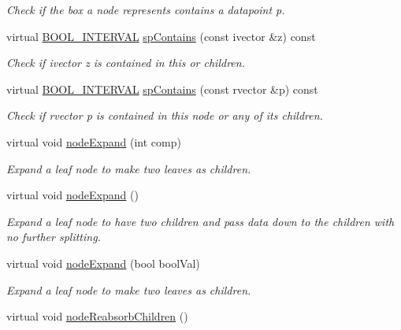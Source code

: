 \begin{DoxyCompactItemize}
\begin{DoxyCompactList}\small\item\em \-Check if the box a node represents contains a datapoint p. \end{DoxyCompactList}\item 
virtual \hyperlink{namespacesubpavings_abf44b15764c504d6ffa87c62b45b01a6}{\-B\-O\-O\-L\-\_\-\-I\-N\-T\-E\-R\-V\-A\-L} \hyperlink{classsubpavings_1_1SPnode_aa90c047beb6a8b6a4beb74342ad593a3}{sp\-Contains} (const ivector \&z) const 
\begin{DoxyCompactList}\small\item\em \-Check if ivector z is contained in this or children. \end{DoxyCompactList}\item 
virtual \hyperlink{namespacesubpavings_abf44b15764c504d6ffa87c62b45b01a6}{\-B\-O\-O\-L\-\_\-\-I\-N\-T\-E\-R\-V\-A\-L} \hyperlink{classsubpavings_1_1SPnode_a56f98ed5bc26b9b11dfce51f3e667e2b}{sp\-Contains} (const rvector \&p) const 
\begin{DoxyCompactList}\small\item\em \-Check if rvector p is contained in this node or any of its children. \end{DoxyCompactList}\item 
virtual void \hyperlink{classsubpavings_1_1SPnode_ac27ee8ea1399ed0121ed970c8fd51543}{node\-Expand} (int comp)
\begin{DoxyCompactList}\small\item\em \-Expand a leaf node to make two leaves as children. \end{DoxyCompactList}\item 
virtual void \hyperlink{classsubpavings_1_1SPnode_a0540c55967e7f35843fac029b450ab55}{node\-Expand} ()
\begin{DoxyCompactList}\small\item\em \-Expand a leaf node to have two children and pass data down to the children with no further splitting. \end{DoxyCompactList}\item 
virtual void \hyperlink{classsubpavings_1_1SPnode_a3b16d632897f3a4fb11f36db1e9004bf}{node\-Expand} (bool bool\-Val)
\begin{DoxyCompactList}\small\item\em \-Expand a leaf node to make two leaves as children. \end{DoxyCompactList}\item 
virtual void \hyperlink{classsubpavings_1_1SPnode_ab92c1accdfd155898e63e26a112b8e36}{node\-Reabsorb\-Children} ()

\end{DoxyCompactItemize}
